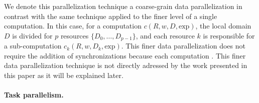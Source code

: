 We denote this parallelization technique a coarse-grain data parallelization in contrast with the same technique applied to the finer level of a single computation. In this case, for a computation $c(R,w,D,\text{exp})$, the local domain $D$ is divided for $p$ resources $\{D_0,\dots,D_{p-1}\}$, and each resource $k$ is responsible for a sub-computation $c_k(R,w,D_k,\text{exp})$.
This finer data parallelization does not require the addition of synchronizations because each computation . This finer data parallelization technique is not directly adressed by the work presented in this paper as it will be explained later. 

\paragraph{Task parallelism.}

